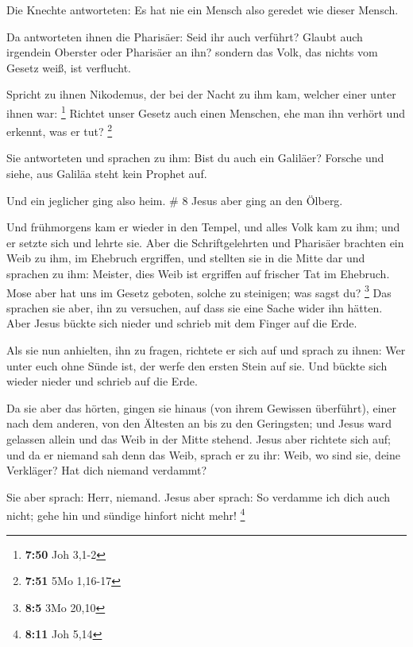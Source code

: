  Die Knechte antworteten: Es hat nie ein Mensch also
geredet wie dieser Mensch.

 Da antworteten ihnen die Pharisäer: Seid ihr auch
verführt?  Glaubt auch irgendein Oberster oder Pharisäer an
ihn?  sondern das Volk, das nichts vom Gesetz weiß, ist
verflucht.

 Spricht zu ihnen Nikodemus, der bei der Nacht zu ihm kam,
welcher einer unter ihnen war: \footnote{\textbf{7:50} Joh 3,1-2}
 Richtet unser Gesetz auch einen Menschen, ehe man ihn
verhört und erkennt, was er tut? \footnote{\textbf{7:51} 5Mo 1,16-17}

 Sie antworteten und sprachen zu ihm: Bist du auch ein
Galiläer? Forsche und siehe, aus Galiläa steht kein Prophet auf.

 Und ein jeglicher ging also heim. \# 8  Jesus
aber ging an den Ölberg.

 Und frühmorgens kam er wieder in den Tempel, und alles Volk
kam zu ihm; und er setzte sich und lehrte sie.  Aber die
Schriftgelehrten und Pharisäer brachten ein Weib zu ihm, im Ehebruch
ergriffen, und stellten sie in die Mitte dar  und sprachen
zu ihm: Meister, dies Weib ist ergriffen auf frischer Tat im Ehebruch.
 Mose aber hat uns im Gesetz geboten, solche zu steinigen;
was sagst du? \footnote{\textbf{8:5} 3Mo 20,10}  Das
sprachen sie aber, ihn zu versuchen, auf dass sie eine Sache wider ihn
hätten. Aber Jesus bückte sich nieder und schrieb mit dem Finger auf die
Erde.

 Als sie nun anhielten, ihn zu fragen, richtete er sich auf
und sprach zu ihnen: Wer unter euch ohne Sünde ist, der werfe den ersten
Stein auf sie.  Und bückte sich wieder nieder und schrieb
auf die Erde.

 Da sie aber das hörten, gingen sie hinaus (von ihrem
Gewissen überführt), einer nach dem anderen, von den Ältesten an bis zu
den Geringsten; und Jesus ward gelassen allein und das Weib in der Mitte
stehend.  Jesus aber richtete sich auf; und da er niemand
sah denn das Weib, sprach er zu ihr: Weib, wo sind sie, deine Verkläger?
Hat dich niemand verdammt?

 Sie aber sprach: Herr, niemand. Jesus aber sprach: So
verdamme ich dich auch nicht; gehe hin und sündige hinfort nicht mehr!
\footnote{\textbf{8:11} Joh 5,14}

